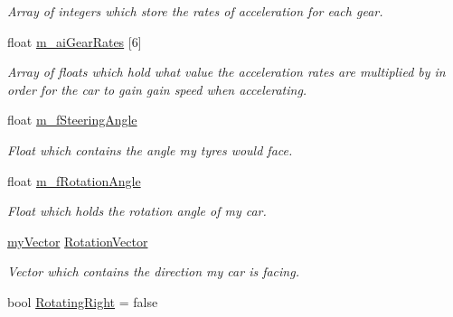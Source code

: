 \begin{DoxyCompactItemize}
\begin{DoxyCompactList}\small\item\em Array of integers which store the rates of acceleration for each gear. \end{DoxyCompactList}\item 
\hypertarget{class_car_aeec39fb67a456684cac701c2b828b173}{}float \hyperlink{class_car_aeec39fb67a456684cac701c2b828b173}{m\+\_\+ai\+Gear\+Rates} \mbox{[}6\mbox{]}\label{class_car_aeec39fb67a456684cac701c2b828b173}

\begin{DoxyCompactList}\small\item\em Array of floats which hold what value the acceleration rates are multiplied by in order for the car to gain gain speed when accelerating. \end{DoxyCompactList}\item 
\hypertarget{class_car_aa9a2cb08891629d7b40e9e01e219da21}{}float \hyperlink{class_car_aa9a2cb08891629d7b40e9e01e219da21}{m\+\_\+f\+Steering\+Angle}\label{class_car_aa9a2cb08891629d7b40e9e01e219da21}

\begin{DoxyCompactList}\small\item\em Float which contains the angle my tyres would face. \end{DoxyCompactList}\item 
\hypertarget{class_car_a982be320c4ff138458a2d9aa6c14ed54}{}float \hyperlink{class_car_a982be320c4ff138458a2d9aa6c14ed54}{m\+\_\+f\+Rotation\+Angle}\label{class_car_a982be320c4ff138458a2d9aa6c14ed54}

\begin{DoxyCompactList}\small\item\em Float which holds the rotation angle of my car. \end{DoxyCompactList}\item 
\hypertarget{class_car_ad3930029165ec53a59367e5c27261500}{}\hyperlink{classmy_vector}{my\+Vector} \hyperlink{class_car_ad3930029165ec53a59367e5c27261500}{Rotation\+Vector}\label{class_car_ad3930029165ec53a59367e5c27261500}

\begin{DoxyCompactList}\small\item\em Vector which contains the direction my car is facing. \end{DoxyCompactList}\item 
\hypertarget{class_car_a53ecb53c65d3a0a27905e8c080758188}{}bool \hyperlink{class_car_a53ecb53c65d3a0a27905e8c080758188}{Rotating\+Right} = false\label{class_car_a53ecb53c65d3a0a27905e8c080758188}


\end{DoxyCompactItemize}

